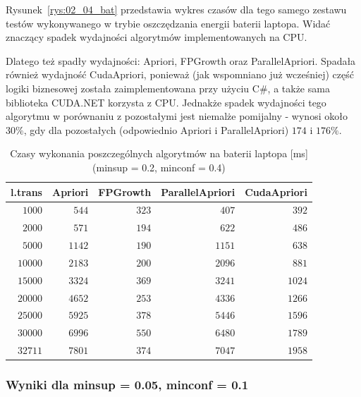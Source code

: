 Rysunek~\ref{rys:02_04_bat} przedstawia wykres czasów dla tego samego zestawu testów wykonywanego w trybie oszczędzania energii baterii laptopa. Widać znaczący spadek wydajności algorytmów implementowanych na CPU.

Dlatego też spadły wydajności: Apriori, FPGrowth oraz ParallelApriori. Spadała również wydajność CudaApriori, ponieważ (jak wspomniano już wcześniej) część logiki biznesowej została zaimplementowana przy użyciu C\#, a także sama biblioteka CUDA.NET korzysta z CPU. Jednakże spadek wydajności tego algorytmu w porównaniu z pozostałymi jest niemalże pomijalny - wynosi około $30\%$, gdy dla pozostałych (odpowiednio Apriori i ParallelApriori) $174$ i $176\%$.

\begin{table}
	\centering
	\begin{tabular}{r|r|r|r|r}
	\textbf{l.trans} & \textbf{Apriori} & \textbf{FPGrowth} & \textbf{ParallelApriori} & \textbf{CudaApriori}  \\ \hline
	$1000$ & $544$ & $323$ & $407$ & $392$ \\
	$2000$ & $571$ & $194$ & $622$ & $486$ \\
	$5000$ & $1142$ & $190$ & $1151$ & $638$ \\
	$10000$ & $2183$ & $200$ & $2096$ & $881$ \\
	$15000$ & $3324$ & $369$ & $3241$ & $1024$ \\
	$20000$ & $4652$ & $253$ & $4336$ & $1266$ \\
	$25000$ & $5925$ & $378$ & $5446$ & $1596$ \\
	$30000$ & $6996$ & $550$ & $6480$ & $1789$ \\
	$32711$ & $7801$ & $374$ & $7047$ & $1958$ \\
	\end{tabular}
	\caption{Czasy wykonania poszczególnych algorytmów na baterii laptopa [ms] (minsup = 0.2, minconf = 0.4)\label{tab:02_04_bat}}
\end{table}
\subsubsection{Wyniki dla minsup = 0.05, minconf = 0.1}

